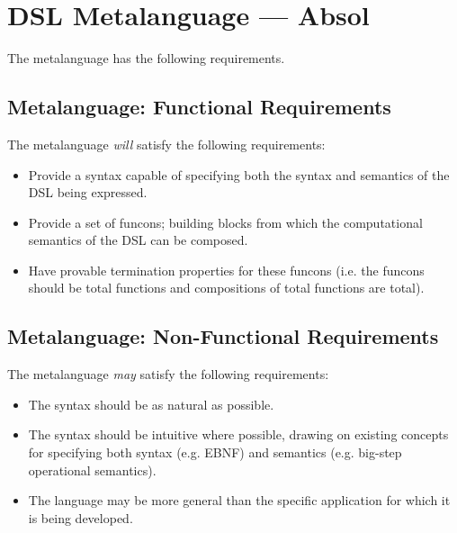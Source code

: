\documentclass[a4paper,11pt]{report}
\begin{document}



\section{DSL Metalanguage --- Absol} %
\label{sec:dsl_metalanguage_absol}
The metalanguage has the following requirements.

\subsection{Metalanguage: Functional Requirements} %
\label{sub:metalanguage_functional_requirements}
The metalanguage \textit{will} satisfy the following requirements:
\begin{itemize}
    \item Provide a syntax capable of specifying both the syntax and semantics of the DSL being expressed.
    \item Provide a set of funcons; building blocks from which the computational semantics of the DSL can be composed. 
    \item Have provable termination properties for these funcons (i.e. the funcons should be total functions and compositions of total functions are total).
\end{itemize}


\subsection{Metalanguage: Non-Functional Requirements} %
\label{sub:metalanguage_non_functional_requirements}
The metalanguage \textit{may} satisfy the following requirements:
\begin{itemize}
    \item The syntax should be as natural as possible.
    \item The syntax should be intuitive where possible, drawing on existing concepts for specifying both syntax (e.g. EBNF) and semantics (e.g. big-step operational semantics).
    \item The language may be more general than the specific application for which it is being developed.
\end{itemize}
\end{document}
